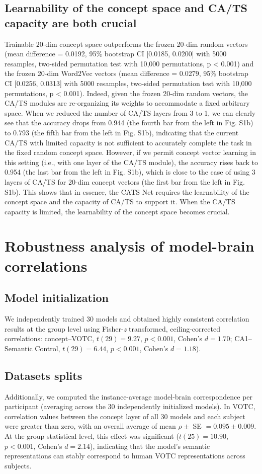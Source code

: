\documentclass[pdflatex,sn-mathphys-num,lineno]{sn-jnl}%
\begin{document}
\begin{CJK}{UTF8}{gbsn}
\subsection{Learnability of the concept space and CA/TS capacity are both crucial}
Trainable 20-dim concept space outperforms the frozen 20-dim random vectors (mean difference = 0.0192, 95\% bootstrap CI [0.0185, 0.0200] with 5000 resamples, two-sided permutation test with 10,000 permutations, p < 0.001) and the frozen 20-dim Word2Vec vectors (mean difference = 0.0279, 95\% bootstrap CI [0.0256, 0.0313] with 5000 resamples, two-sided permutation test with 10,000 permutations, p < 0.001). Indeed, given the frozen 20-dim random vectors, the CA/TS modules are re-organizing its weights to accommodate a fixed arbitrary space. When we reduced the number of CA/TS layers from 3 to 1, we can clearly see that the accuracy drops from 0.944 (the fourth bar from the left in Fig. S1b) to 0.793 (the fifth bar from the left in Fig. S1b), indicating that the current CA/TS with limited capacity is not sufficient to accurately complete the task in the fixed random concept space. However, if we permit concept vector learning in this setting (i.e., with one layer of the CA/TS module), the accuracy rises back to 0.954 (the last bar from the left in Fig. S1b), which is close to the case of using 3 layers of CA/TS for 20-dim concept vectors (the first bar from the left in Fig. S1b). This shows that in essence, the CATS Net requires the learnability of the concept space and the capacity of CA/TS to support it. When the CA/TS capacity is limited, the learnability of the concept space becomes crucial.

\section{Robustness analysis of model-brain correlations}
\subsection{Model initialization}
We independently trained 30 models and obtained highly consistent correlation results at the group level using Fisher-\textit{z} transformed, ceiling-corrected correlations: concept–VOTC, $t(29) = 9.27$, $p < 0.001$, Cohen’s 
$d = 1.70$; CA1–Semantic Control, $t(29) = 6.44$, $p < 0.001$, Cohen’s $d = 1.18$).

\subsection{Datasets splits}
Additionally, we computed the instance-average model-brain correspondence per participant (averaging across the 30 independently initialized models). In VOTC, correlation values between the concept layer of all 30 models and each subject were greater than zero, with an overall average of mean $\rho \pm$ SE $= 0.095 \pm 0.009$. At the group statistical level, this effect was significant ($t(25) = 10.90$, $p < 0.001$, Cohen’s $d = 2.14$), indicating that the model's semantic representations can stably correspond to human VOTC representations across subjects.


\end{CJK}
\end{document}
